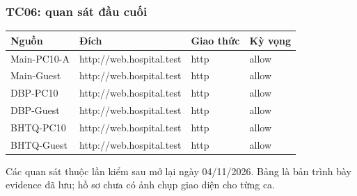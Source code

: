 \clearpage

\subsubsection{TC06: quan sát đầu
cuối}\label{tc06-quan-suxe1t-ux111ux1ea7u-cuux1ed1i}

{\def\LTcaptype{none} %
\begin{longtable}[]{@{}llll@{}}
\toprule\noalign{}
Nguồn & Đích & Giao thức & Kỳ vọng \\
\midrule\noalign{}
\endhead
\bottomrule\noalign{}
\endlastfoot
Main-PC10-A & http://web.hospital.test & http & allow \\
Main-Guest & http://web.hospital.test & http & allow \\
DBP-PC10 & http://web.hospital.test & http & allow \\
DBP-Guest & http://web.hospital.test & http & allow \\
BHTQ-PC10 & http://web.hospital.test & http & allow \\
BHTQ-Guest & http://web.hospital.test & http & allow \\
\end{longtable}
}

Các quan sát thuộc lần kiểm sau mở lại ngày 04/11/2026. Bảng là bản
trình bày evidence đã lưu; hồ sơ chưa có ảnh chụp giao diện cho từng ca.

\FloatBarrier
\FloatBarrier
\clearpage
